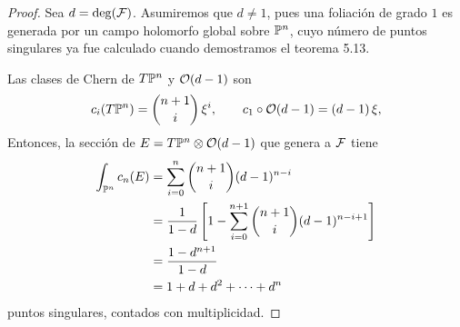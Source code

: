 \begin{proof}
Sea $d = \deg(\F)$. Asumiremos que $d \ne 1$, pues una foliación de grado $1$ es generada por un campo holomorfo global sobre $\P^n$, cuyo número de puntos singulares ya fue calculado cuando demostramos el teorema 5.13.

Las clases de Chern de $T\P^n$ y $\O(d-1)$ son
$$c_i(T\P^n) = \binom {n+1} i \, \xi^i, \qquad c_1 \circ \O(d-1) = (d-1) \, \xi,$$
Entonces, la sección de $E = T\P^n \otimes \O(d-1)$ que genera a $\F$ tiene
\begin{align*}
    \int_{\P^n} c_n(E)
        &= \sum_{i=0}^n \binom {n+1} i (d-1)^{n-i} \\
        &= \dfrac 1 {1-d} \left[ 1 - \sum_{i=0}^{n+1} \binom {n+1} i (d-1)^{n-i+1} \right] \\
        &= \dfrac {1 - d^{n+1}} {1 - d} \\
        &= 1 + d + d^2 + \dots + d^n
\end{align*}
puntos singulares, contados con multiplicidad.
\end{proof}
